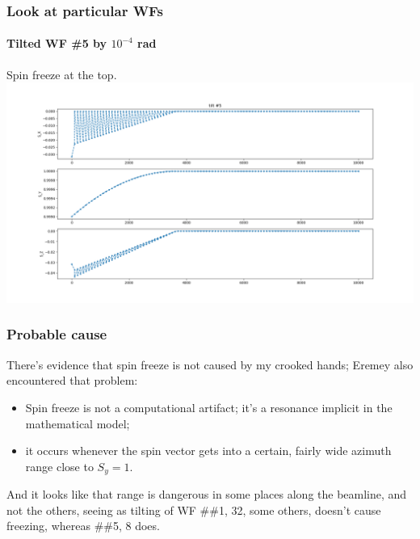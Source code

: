 \documentclass[pdf]{beamer}
\begin{document}
\begin{frame}\frametitle{Look at particular WFs}
\framesubtitle{Tilted WF \#5 by $10^{-4}$ rad}
	Spin freeze at the top.
	\centering
	\includegraphics[scale=.3]{freeze/TITLS_TEST_5thWF_1e-4rad}
\end{frame}
\begin{frame}
	\frametitle{Probable cause}
	There's evidence that spin freeze is not caused by my crooked hands; Eremey also encountered that problem:
	\begin{itemize}
		\item Spin freeze is not a computational artifact; it's a resonance implicit in the mathematical model;
		\item it occurs whenever the spin vector gets into a certain, fairly wide azimuth range close to $S_y = 1$.
	\end{itemize}
	And it looks like that range is dangerous in some places along the beamline, and not the others, seeing as tilting of WF \#\#1, 32, some others, doesn't cause freezing, whereas \#\#5, 8 does.
\end{frame}
\end{document}

